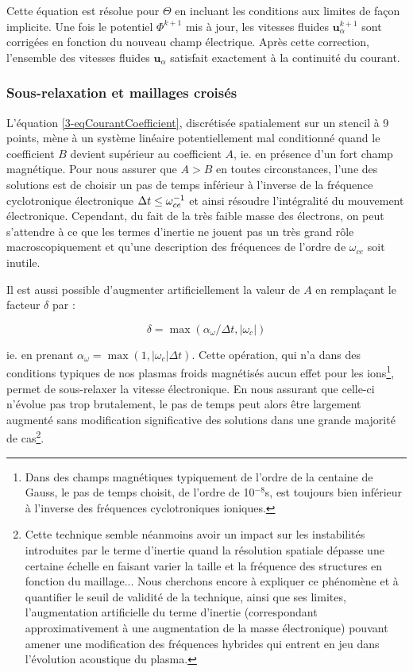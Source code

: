\begin{refsection}
Cette équation est résolue pour $\Theta$ en incluant les conditions aux limites
de façon implicite. Une fois le potentiel $\Phi^{k+1}$ mis à jour, les vitesses
fluides $\mathbf u^{k+1}_\alpha$ sont corrigées en fonction du nouveau champ
électrique.
Après cette correction, l'ensemble des vitesses fluides $\mathbf u_\alpha$
satisfait exactement à la continuité du courant.

\subsubsection{Sous-relaxation et maillages croisés}

L'équation \eqref{3-eqCourantCoefficient}, discrétisée spatialement sur un
stencil à 9 points, mène à un système linéaire potentiellement mal conditionné
quand le coefficient $B$ devient supérieur au coefficient $A$, ie. en présence
d'un fort champ magnétique. Pour nous assurer que $A>B$ en toutes circonstances,
l'une des solutions est de choisir un pas de temps inférieur à l'inverse de la
fréquence cyclotronique électronique $\Delta t\leq\omega_{ce}^{{-1}}$ et
ainsi résoudre l'intégralité du mouvement électronique. Cependant, du fait de la
très faible masse des électrons, on peut s'attendre à ce que les termes
d'inertie ne jouent pas un très grand rôle macroscopiquement et qu'une
description des fréquences de l'ordre de $\omega_{ce}$ soit inutile.

Il est aussi possible d'augmenter artificiellement la valeur de $A$ en
remplaçant le facteur $\delta$ par :

\begin{equation*}
\delta=\max(\alpha_\omega/\Delta t,|\omega_c|)
\end{equation*}

ie. en prenant $\alpha_\omega=\max(1,|\omega_c|\Delta t)$.
Cette opération, qui n'a dans des conditions typiques de nos plasmas froids
magnétisés aucun effet pour les ions\footnote{Dans des champs magnétiques
typiquement de l'ordre de la centaine de Gauss, le pas de temps choisit, de l'ordre de 10$^{-8}$s, est toujours bien
inférieur à l'inverse des fréquences cyclotroniques ioniques.}, permet de
sous-relaxer la vitesse électronique. En nous assurant
que celle-ci n'évolue pas trop brutalement, le pas de temps peut alors être
largement augmenté sans modification significative des solutions dans une
grande majorité de cas\footnote{Cette
technique semble néanmoins avoir un impact sur les
instabilités introduites par le terme d'inertie quand la résolution spatiale
dépasse une certaine échelle en faisant varier la taille et la fréquence des
structures en fonction du maillage...
Nous cherchons encore à expliquer ce phénomène et à quantifier le seuil de
validité de la technique, ainsi que ses limites, l'augmentation artificielle du
terme d'inertie (correspondant approximativement à une augmentation de la masse
électronique) pouvant amener une modification des fréquences hybrides qui entrent en jeu dans
l'évolution acoustique du plasma.}.


\end{refsection}
